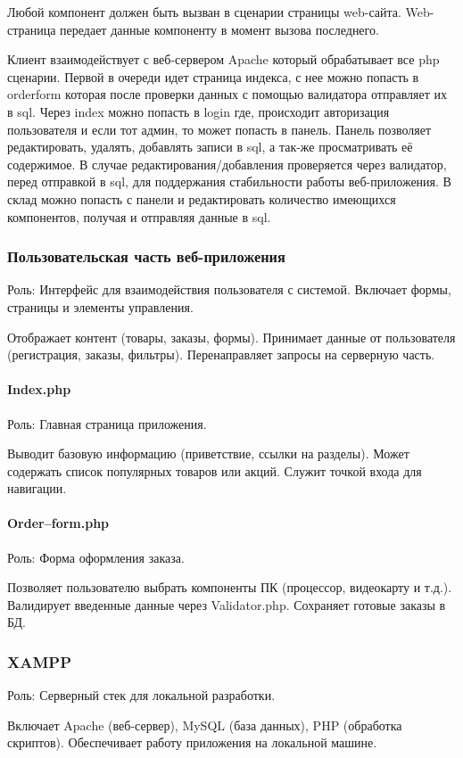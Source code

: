 Любой компонент должен быть вызван в сценарии страницы web-сайта. Web-страница передает данные компоненту в момент вызова последнего.

Клиент взаимодействует с веб-сервером Apache который обрабатывает все php сценарии. Первой в очереди идет страница индекса, с нее можно попасть в orderform которая после проверки данных с помощью валидатора отправляет их в sql. Через index можно попасть в login где, происходит авторизация пользователя и если тот админ, то может попасть в панель. Панель позволяет редактировать, удалять, добавлять записи в sql, а так-же просматривать её содержимое. В случае редактирования/добавления проверяется через валидатор, перед отправкой в sql, для поддержания стабильности работы веб-приложения. В склад можно попасть с панели и редактировать количество имеющихся компонентов, получая и отправляя данные в sql.
\newpage
\subsubsection{Пользовательская часть веб-приложения}
Роль: Интерфейс для взаимодействия пользователя с системой. Включает формы, страницы и элементы управления.

Отображает контент (товары, заказы, формы).
Принимает данные от пользователя (регистрация, заказы, фильтры).
Перенаправляет запросы на серверную часть.
\paragraph{Index.php} 
Роль: Главная страница приложения.

Выводит базовую информацию (приветствие, ссылки на разделы).
Может содержать список популярных товаров или акций.
Служит точкой входа для навигации.
\paragraph{Order--form.php} 
Роль: Форма оформления заказа.

Позволяет пользователю выбрать компоненты ПК (процессор, видеокарту и т.д.).
Валидирует введенные данные через Validator.php.
Сохраняет готовые заказы в БД.
\subsubsection{XAMPP}
Роль: Серверный стек для локальной разработки.

Включает Apache (веб-сервер), MySQL (база данных), PHP (обработка скриптов).
Обеспечивает работу приложения на локальной машине.
